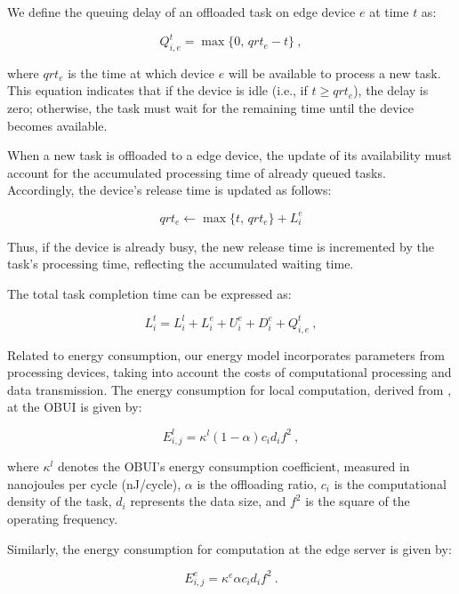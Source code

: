 \documentclass[iicol]{sn-jnl}
\begin{document}
We define the queuing delay of an offloaded task on edge device $e$ at time $t$ as:

\begin{equation}
    Q_{i,e}^t = \max\{0,\, qrt_e - t\}~,
\end{equation}

where $qrt_e$ is the time at which device $e$ will be available to process a new task. This equation indicates that if the device is idle (i.e., if $t \geq qrt_e$), the delay is zero; otherwise, the task must wait for the remaining time until the device becomes available.

When a new task is offloaded to a edge device, the update of its availability must account for the accumulated processing time of already queued tasks. Accordingly, the device's release time is updated as follows:

\begin{equation}
    qrt_e \leftarrow \max\{t,\, qrt_e\} + L_i^e
\end{equation}

Thus, if the device is already busy, the new release time is incremented by the task's processing time, reflecting the accumulated waiting time.

The total task completion time can be expressed as:
 
\begin{equation}
    L_i^t = L_i^l + L_i^e + U_i^e + D_i^e + Q_{i,e}^t~,
\end{equation}

Related to energy consumption, our energy model incorporates parameters from processing devices, taking into account the costs of computational processing and data transmission. The energy consumption for local computation, derived from \cite{zhang2016energy}, at the OBUI is given by:

\begin{equation}
E_{i,j}^{l}=\kappa^{l}(1-\alpha)c_{i}d_{i}f^{2}~,
\end{equation}

where $\kappa^l$ denotes the OBUI's energy consumption coefficient, measured in nanojoules per cycle (nJ/cycle), $\alpha$ is the offloading ratio, $c_i$ is the computational density of the task, $d_i$ represents the data size, and $f^{2}$ is the square of the operating frequency.

Similarly, the energy consumption for computation at the edge server is given by:

\begin{equation}
E_{i,j}^{e}=\kappa^{e}\alpha c_{i}d_{i}f^{2}~.
\end{equation}
\end{document}
